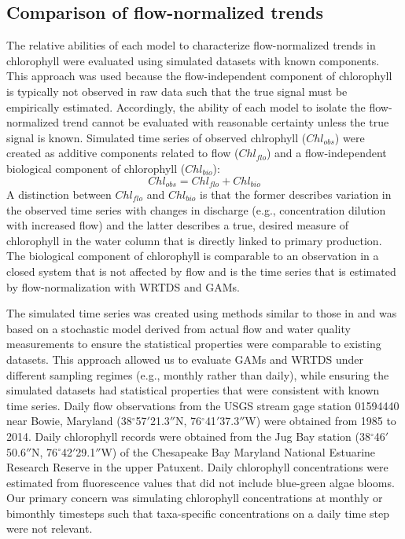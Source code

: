 \documentclass[letterpaper,12pt,oneside]{article}\usepackage[]{graphicx}\usepackage[]{color}
\begin{document}
\subsection{Comparison of flow-normalized trends}

The relative abilities of each model to characterize flow-normalized trends in chlorophyll were evaluated using simulated datasets with known components.  This approach was used because the flow-independent component of chlorophyll is typically not observed in raw data such that the true signal must be empirically estimated.  Accordingly, the ability of each model to isolate the flow-normalized trend cannot be evaluated with reasonable certainty unless the true signal is known.  Simulated time series of observed chlrophyll ($Chl_{obs}$) were created as additive components related to flow ($Chl_{flo}$) and a flow-independent biological component of chlorophyll ($Chl_{bio}$):
\begin{equation} \label{chlobs}
Chl_{obs} = Chl_{flo} + Chl_{bio}
\end{equation}
A distinction between $Chl_{flo}$ and $Chl_{bio}$ is that the former describes variation in the observed time series with changes in discharge (e.g., concentration dilution with increased flow) and the latter describes a true, desired measure of chlorophyll in the water column that is directly linked to primary production.  The biological component of chlorophyll is comparable to an observation in a closed system that is not affected by flow and is the time series that is estimated by flow-normalization with \ac{WRTDS} and \acp{GAM}.

The simulated time series was created using methods similar to those in \citet{Hirsch15} and was based on a stochastic model derived from actual flow and water quality measurements to ensure the statistical properties were comparable to existing datasets.  This approach allowed us to evaluate \acp{GAM} and \ac{WRTDS} under different sampling regimes (e.g., monthly rather than daily), while ensuring the simulated datasets had statistical properties that were consistent with known time series. Daily flow observations from the \ac{USGS} stream gage station 01594440 near Bowie, Maryland (38$^{\circ}$57$'$21.3$''$N, 76$^{\circ}$41$'$37.3$''$W) were obtained from 1985 to 2014.  Daily chlorophyll records were obtained from the Jug Bay station (38$^{\circ}$46$'$50.6$''$N, 76$^{\circ}$42$'$29.1$''$W) of the Chesapeake Bay Maryland National Estuarine Research Reserve in the upper Patuxent.  Daily chlorophyll concentrations were estimated from fluorescence values that did not include blue-green algae blooms.  Our primary concern was simulating chlorophyll concentrations at monthly or bimonthly timesteps such that taxa-specific concentrations on a daily time step were not relevant.
\end{document}
